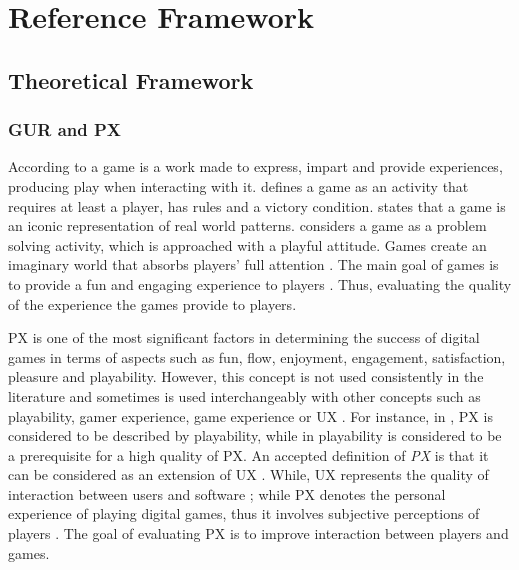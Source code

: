 \chapter{Reference Framework} %
\label{ch:referenceFramework} %

\section{Theoretical Framework}

\subsection{\ac{GUR} and \ac{PX}}
\label{subsec:gur}
According to \textcite{macklin2016games} a game is a work made to express, impart and provide experiences, producing play when interacting with it. \textcite{rogers2014level} defines a game as an activity that requires at least a player, has rules and a victory condition. \textcite{koster2013theory} states that a game is an iconic representation of real world patterns. \textcite{schell2015art} considers a game as a problem solving activity, which is approached with a playful attitude. Games create an imaginary world that absorbs players' full attention \autocite{michael:2006}. The main goal of games is to provide a fun and engaging experience to players \autocite{Moosajee,Zammitto2014}. Thus, evaluating the quality of the experience the games provide to players.

\ac{PX} is one of the most significant factors in determining the success of digital games in terms of aspects such as fun, flow, enjoyment, engagement, satisfaction, pleasure and playability. However, this concept is not used consistently in the literature \autocite{Wiemeyer2016} and sometimes is used interchangeably with other concepts such as playability, gamer experience, game experience or \ac{UX} \autocite{Bernhaupt2015}. For instance, in \autocite{Chu2011,GonzalezSanchez2009}, \ac{PX} is considered to be described by playability, while in \autocite{Nacke2009} playability is considered to be a prerequisite for a high quality of \ac{PX}. An accepted definition of \emph{\ac{PX}} is that it can be considered as an extension of \ac{UX} \autocite{Wiemeyer2016,GonzalezSanchez2009,Bernhaupt2015}. While, \ac{UX} represents the quality of interaction between users and software \autocite{Wiemeyer2016,Bernhaupt2015,Calvillo-Gamez2015}; while \ac{PX} denotes the personal experience of playing digital games, thus it involves subjective perceptions of players \autocite{Wiemeyer2016,Chu2011}. The goal of evaluating \ac{PX} is to improve interaction between players and games.

